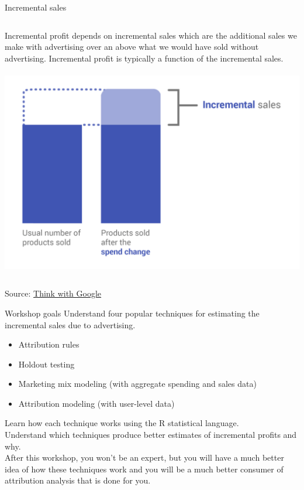 \documentclass[10pt, aspectratio=169]{beamer}
\newcommand{\source}[1]{\begin{flushright} \footnotesize Source: {#1} \end{flushright} \normalsize}
\begin{document}
\begin{frame}{Incremental sales}
\begin{columns}[T]
Incremental profit depends on \alert{incremental sales} which are the additional sales we make with advertising over an above what we would have sold without advertising. Incremental profit is typically a function of the incremental sales.\\
\bigskip 
{}\\
\includegraphics[width=\textwidth]{images/incremental_sales.png}
\end{columns}
\source{\href{https://www.thinkwithgoogle.com/articles/proving-marketing-impact.html}{Think with Google}}
\end{frame}

\begin{frame}{Workshop goals}
Understand four popular techniques for estimating the incremental sales due to advertising. \\
\begin{itemize}
\item Attribution rules
\item Holdout testing
\item Marketing mix modeling (with aggregate spending and sales data)
\item Attribution modeling (with user-level data)
\end{itemize}
\bigskip \pause
Learn how each technique works using the R statistical language. \\
\bigskip \pause
Understand which techniques produce better estimates of incremental profits and why.\\
\bigskip \pause
\alert{After this workshop, you won't be an expert, but you will have a much better idea of how these techniques work and you will be a much better consumer of attribution analysis that is done for you.}
\end{frame}
\end{document}
